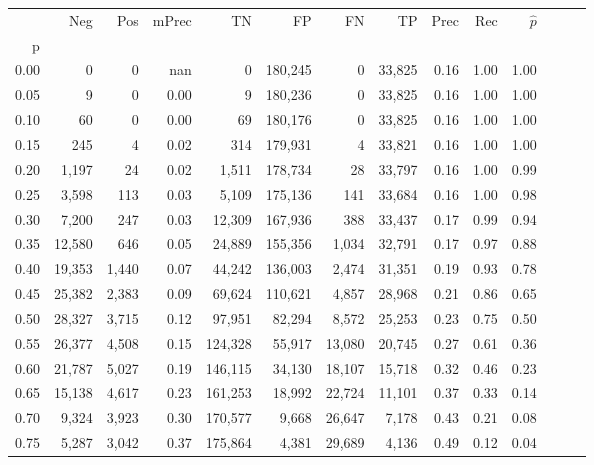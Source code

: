 \begin{tabular}{rrrrrrrrrrrrrr}
\toprule
{} &     Neg &    Pos & mPrec &       TN &       FP &      FN &      TP &  Prec &   Rec & $\hat{p}$ \\
p    &         &        &       &          &          &         &         &       &       &           \\
\midrule
0.00 &       0 &      0 &   nan &        0 &  180,245 &       0 &  33,825 &  0.16 &  1.00 &      1.00 \\
0.05 &       9 &      0 &  0.00 &        9 &  180,236 &       0 &  33,825 &  0.16 &  1.00 &      1.00 \\
0.10 &      60 &      0 &  0.00 &       69 &  180,176 &       0 &  33,825 &  0.16 &  1.00 &      1.00 \\
0.15 &     245 &      4 &  0.02 &      314 &  179,931 &       4 &  33,821 &  0.16 &  1.00 &      1.00 \\
0.20 &   1,197 &     24 &  0.02 &    1,511 &  178,734 &      28 &  33,797 &  0.16 &  1.00 &      0.99 \\
0.25 &   3,598 &    113 &  0.03 &    5,109 &  175,136 &     141 &  33,684 &  0.16 &  1.00 &      0.98 \\
0.30 &   7,200 &    247 &  0.03 &   12,309 &  167,936 &     388 &  33,437 &  0.17 &  0.99 &      0.94 \\
0.35 &  12,580 &    646 &  0.05 &   24,889 &  155,356 &   1,034 &  32,791 &  0.17 &  0.97 &      0.88 \\
0.40 &  19,353 &  1,440 &  0.07 &   44,242 &  136,003 &   2,474 &  31,351 &  0.19 &  0.93 &      0.78 \\
0.45 &  25,382 &  2,383 &  0.09 &   69,624 &  110,621 &   4,857 &  28,968 &  0.21 &  0.86 &      0.65 \\
0.50 &  28,327 &  3,715 &  0.12 &   97,951 &   82,294 &   8,572 &  25,253 &  0.23 &  0.75 &      0.50 \\
0.55 &  26,377 &  4,508 &  0.15 &  124,328 &   55,917 &  13,080 &  20,745 &  0.27 &  0.61 &      0.36 \\
0.60 &  21,787 &  5,027 &  0.19 &  146,115 &   34,130 &  18,107 &  15,718 &  0.32 &  0.46 &      0.23 \\
0.65 &  15,138 &  4,617 &  0.23 &  161,253 &   18,992 &  22,724 &  11,101 &  0.37 &  0.33 &      0.14 \\
0.70 &   9,324 &  3,923 &  0.30 &  170,577 &    9,668 &  26,647 &   7,178 &  0.43 &  0.21 &      0.08 \\
0.75 &   5,287 &  3,042 &  0.37 &  175,864 &    4,381 &  29,689 &   4,136 &  0.49 &  0.12 &      0.04 \\

\end{tabular}
